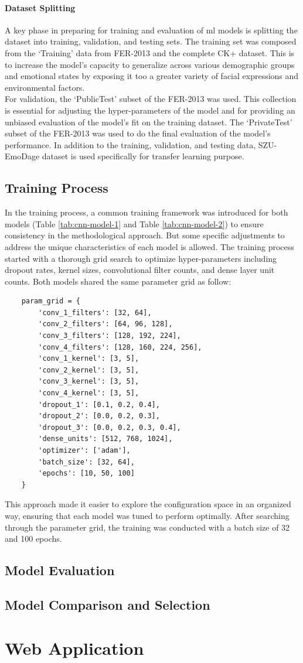 \paragraph{Dataset Splitting}
A key phase in preparing for training and evaluation of \gls{ml} models is splitting the dataset into training, validation, and testing sets. 
The training set was composed from the `Training' data from FER-2013 and the complete CK+ dataset.
This is to increase the model's capacity to generalize across various demographic groups and emotional states by exposing it too a greater variety of facial expressions and environmental factors.
\\
\indent For validation, the `PublicTest' subset of the FER-2013 was used.
This collection is essential for adjusting the hyper-parameters of the model and for providing an unbiased evaluation of the model's fit on the training dataset.
The `PrivateTest' subset of the FER-2013 was used to do the final evaluation of the model's performance.
In addition to the training, validation, and testing data, SZU-EmoDage dataset is used specifically for transfer learning purpose. 
\subsection{Training Process}
In the training process, a common training framework was introduced for both models (Table \ref{tab:cnn-model-1} and Table \ref{tab:cnn-model-2}) to ensure consistency in the methodological approach.
But some specific adjustments to address the unique characteristics of each model is allowed.
The training process started with a thorough grid search to optimize hyper-parameters including dropout rates, kernel sizes, convolutional filter counts, and dense layer unit counts.
Both models shared the same parameter grid as follow:
\begin{verbatim}
    param_grid = {
        'conv_1_filters': [32, 64],
        'conv_2_filters': [64, 96, 128],
        'conv_3_filters': [128, 192, 224],
        'conv_4_filters': [128, 160, 224, 256],
        'conv_1_kernel': [3, 5],
        'conv_2_kernel': [3, 5],
        'conv_3_kernel': [3, 5],
        'conv_4_kernel': [3, 5],
        'dropout_1': [0.1, 0.2, 0.4],
        'dropout_2': [0.0, 0.2, 0.3],
        'dropout_3': [0.0, 0.2, 0.3, 0.4],
        'dense_units': [512, 768, 1024],
        'optimizer': ['adam'],
        'batch_size': [32, 64],  
        'epochs': [10, 50, 100] 
    }
\end{verbatim}
This approach made it easier to explore the configuration space in an organized way, ensuring that each model was tuned to perform optimally.
After searching through the parameter grid, the training was conducted with a batch size of 32 and 100 epochs. 
\subsection{Model Evaluation}
\subsection{Model Comparison and Selection}
\section{Web Application}

